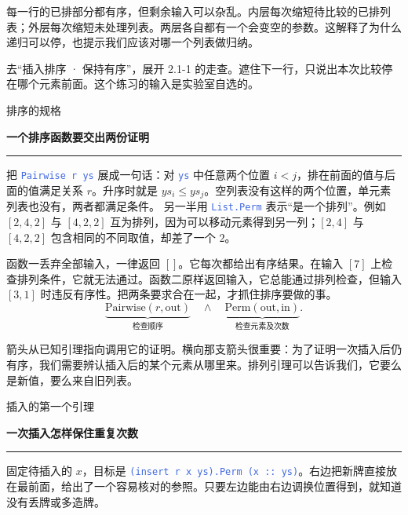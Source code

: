 \documentclass[UTF8,11pt,a4paper,fontset=fandol]{ctexart}
\newcommand{\HandoutLesson}[2]{%
  \par{\small\heiti\color{BrickRed}#1}\par\vspace{3pt}
  {\fontsize{21}{27}\selectfont\heiti\bfseries #2}\par
  \textcolor{BrickRed}{\rule{\linewidth}{.7pt}}\par}
\newcommand{\HandoutBox}[1]{%
  \par\noindent\begingroup\setlength{\fboxsep}{8pt}%
  \colorbox{BrickRed!9}{\parbox{\dimexpr\linewidth-16pt\relax}{#1}}\endgroup\par}
\newcommand{\src}[1]{\textcolor{RoyalBlue}{\texttt{#1}}}
\newcommand{\subhead}[1]{\par\vspace{3pt}{\heiti\bfseries\color{RoyalBlue}#1}\par}
\begin{document}
每一行的已排部分都有序，但剩余输入可以杂乱。内层每次缩短待比较的已排列表；外层每次缩短未处理列表。两层各自都有一个会变空的参数。这解释了为什么递归可以停，也提示我们应该对哪一个列表做归纳。
\HandoutBox{去“插入排序 · 保持有序”，展开 2.1-1 的走查。遮住下一行，只说出本次比较停在哪个元素前面。这个练习的输入是实验室自选的。}
\par{}
\clearpage{}\label{p11}\HandoutLesson{排序的规格}{一个排序函数要交出两份证明}
把 \src{Pairwise r ys} 展成一句话：对 \src{ys} 中任意两个位置 $i<j$，排在前面的值与后面的值满足关系 $r$。升序时就是 $ys_i\le ys_j$。空列表没有这样的两个位置，单元素列表也没有，两者都满足条件。
另一半用 \src{List.Perm} 表示“是一个排列”。例如 $[2,4,2]$ 与 $[4,2,2]$ 互为排列，因为可以移动元素得到另一列；$[2,4]$ 与 $[4,2,2]$ 包含相同的不同取值，却差了一个 $2$。
\subhead{用两个坏算法检查规格写得够不够}
函数一丢弃全部输入，一律返回 $[]$。它每次都给出有序结果。在输入 $[7]$ 上检查排列条件，它就无法通过。函数二原样返回输入，它总能通过排列检查，但输入 $[3,1]$ 时违反有序性。把两条要求合在一起，才抓住排序要做的事。
\[
 \underbrace{\mathrm{Pairwise}(r,\mathrm{out})}_{\text{检查顺序}}
 \quad\land\quad
 \underbrace{\mathrm{Perm}(\mathrm{out},\mathrm{in})}_{\text{检查元素及次数}}.
\]
\subhead{证明怎样接起来}
\begin{center}\end{center}
箭头从已知引理指向调用它的证明。横向那支箭头很重要：为了证明一次插入后仍有序，我们需要辨认插入后的某个元素从哪里来。排列引理可以告诉我们，它要么是新值，要么来自旧列表。
\par{}
\clearpage{}\label{p12}\HandoutLesson{插入的第一个引理}{一次插入怎样保住重复次数}
固定待插入的 $x$，目标是 \src{(insert r x ys).Perm (x :: ys)}。右边把新牌直接放在最前面，给出了一个容易核对的参照。只要左边能由右边调换位置得到，就知道没有丢牌或多造牌。
\end{document}

